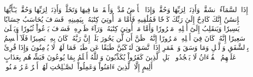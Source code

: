 إِذَا ٱلسَّمَآءُ ٱنشَقَّتۡ
وَأَذِنَتۡ لِرَبِّهَا وَحُقَّتۡ
وَإِذَا ٱلۡأَرۡضُ مُدَّتۡ
وَأَلۡقَتۡ مَا فِيهَا وَتَخَلَّتۡ
وَأَذِنَتۡ لِرَبِّهَا وَحُقَّتۡ
يَـٰٓأَيُّهَا ٱلۡإِنسَٰنُ إِنَّكَ كَادِحٌ إِلَىٰ رَبِّكَ كَدۡحٗا فَمُلَٰقِيهِ
فَأَمَّا مَنۡ أُوتِيَ كِتَٰبَهُۥ بِيَمِينِهِۦ
فَسَوۡفَ يُحَاسَبُ حِسَابٗا يَسِيرٗا
وَيَنقَلِبُ إِلَىٰٓ أَهۡلِهِۦ مَسۡرُورٗا
وَأَمَّا مَنۡ أُوتِيَ كِتَٰبَهُۥ وَرَآءَ ظَهۡرِهِۦ
فَسَوۡفَ يَدۡعُواْ ثُبُورٗا
وَيَصۡلَىٰ سَعِيرًا
إِنَّهُۥ كَانَ فِيٓ أَهۡلِهِۦ مَسۡرُورًا
إِنَّهُۥ ظَنَّ أَن لَّن يَحُورَ
بَلَىٰٓۚ إِنَّ رَبَّهُۥ كَانَ بِهِۦ بَصِيرٗا
فَلَآ أُقۡسِمُ بِٱلشَّفَقِ
وَٱلَّيۡلِ وَمَا وَسَقَ
وَٱلۡقَمَرِ إِذَا ٱتَّسَقَ
لَتَرۡكَبُنَّ طَبَقًا عَن طَبَقٖ
فَمَا لَهُمۡ لَا يُؤۡمِنُونَ
وَإِذَا قُرِئَ عَلَيۡهِمُ ٱلۡقُرۡءَانُ لَا يَسۡجُدُونَۤ۩
بَلِ ٱلَّذِينَ كَفَرُواْ يُكَذِّبُونَ
وَٱللَّهُ أَعۡلَمُ بِمَا يُوعُونَ
فَبَشِّرۡهُم بِعَذَابٍ أَلِيمٍ
إِلَّا ٱلَّذِينَ ءَامَنُواْ وَعَمِلُواْ ٱلصَّـٰلِحَٰتِ لَهُمۡ أَجۡرٌ غَيۡرُ مَمۡنُونِۭ